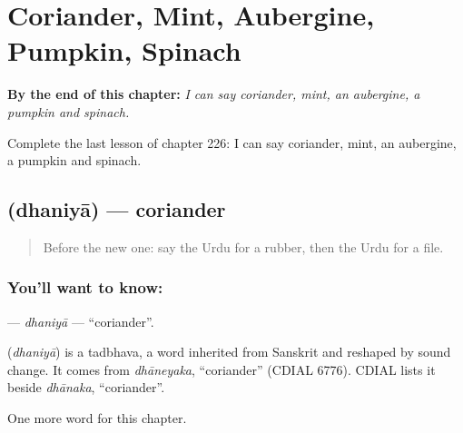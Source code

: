 
\chapter{Coriander, Mint, Aubergine, Pumpkin, Spinach}
\label{ch:ur-coriander-mint-aubergine-pumpkin-spinach}

\begin{chapteropening}
\textbf{By the end of this chapter:} \emph{I can say coriander, mint, an aubergine, a pumpkin and spinach.}

Complete the last lesson of chapter 226: I can say coriander, mint, an aubergine, a pumpkin and spinach.
\end{chapteropening}

\section[\texorpdfstring{\ur{دھنیا} (dhaniyā)}{دھنیا (dhaniyā)}]{ (dhaniyā) — coriander}

\label{lesson:UR-C226-dhaniya}



\begin{quote}
Before the new one: say the Urdu for a rubber, then the Urdu for a file.
\end{quote}

\subsection*{You'll want to know: }
\textbf{} — \emph{dhaniyā} — \textquotedblleft{}coriander\textquotedblright{}.

\begin{cousinweb}
\textbf{} (\emph{dhaniyā}) is a tadbhava, a word inherited from Sanskrit and reshaped by sound change. It comes from \emph{dhāneyaka}, \textquotedblleft{}coriander\textquotedblright{} (CDIAL 6776). CDIAL lists it beside \emph{dhānaka}, \textquotedblleft{}coriander\textquotedblright{}.
\end{cousinweb}

\begin{grammarlens}[title={What you've built}]
One more word for this chapter.
\end{grammarlens}

